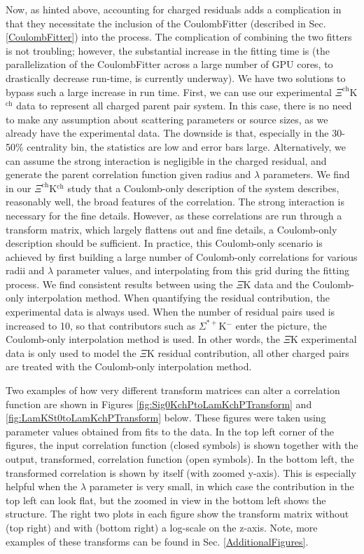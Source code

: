 \documentclass[/home/jesse/Analysis/FemtoAnalysis/AnalysisNotes/AnalysisNoteJBuxton.tex]{subfiles}
\begin{document}
Now, as hinted above, accounting for charged residuals adds a complication in that they necessitate the inclusion of the CoulombFitter (described in Sec. \ref{CoulombFitter}) into the process.  The complication of combining the two fitters is not troubling; however, the substantial increase in the fitting time is (the parallelization of the CoulombFitter across a large number of GPU cores, to drastically decrease run-time, is currently underway).  We have two solutions to bypass such a large increase in run time.  First, we can use our experimental $\Xi^{\mathrm{ch}}$K$^{\mathrm{ch}}$ data to represent all charged parent pair system.  In this case, there is no need to make any assumption about scattering parameters or source sizes, as we already have the experimental data.  The downside is that, especially in the 30-50\% centrality bin, the statistics are low and error bars large.  Alternatively, we can assume the strong interaction is negligible in the charged residual, and generate the parent correlation function given radius and $\lambda$ parameters.  We find in our $\Xi^{\mathrm{ch}}$K$^{\mathrm{ch}}$ study that a Coulomb-only description of the system describes, reasonably well, the broad features of the correlation.  The strong interaction is necessary for the fine details.  However, as these correlations are run through a transform matrix, which largely flattens out and fine details, a Coulomb-only description should be sufficient.  In practice, this Coulomb-only scenario is achieved by first building a large number of Coulomb-only correlations for various radii and $\lambda$ parameter values, and interpolating from this grid during the fitting process.  We find consistent results between using the $\Xi$K data and the Coulomb-only interpolation method.  When quantifying the \XiKpm residual contribution, the experimental \XiKpm data is always used.  When the number of residual pairs used is increased to 10, so that contributors such as $\Sigma^{*+}$K$^{-}$ enter the picture, the Coulomb-only interpolation method is used.  In other words, the $\Xi$K experimental data is only used to model the $\Xi$K residual contribution, all other charged pairs are treated with the Coulomb-only interpolation method.

Two examples of how very different transform matrices can alter a correlation function are shown in Figures \ref{fig:Sig0KchPtoLamKchPTransform} and \ref{fig:LamKSt0toLamKchPTransform} below.  These figures were taken using parameter values obtained from fits to the data.  In the top left corner of the figures, the input correlation function (closed symbols) is shown together with the output, transformed, correlation function (open symbols).  In the bottom left, the transformed correlation is shown by itself (with zoomed y-axis).  This is especially helpful when the $\lambda$ parameter is very small, in which case the contribution in the top left can look flat, but the zoomed in view in the bottom left shows the structure.  The right two plots in each figure show the transform matrix without (top right) and with (bottom right) a log-scale on the z-axis.  Note, more examples of these transforms can be found in Sec. \ref{AdditionalFigures}.
\end{document}
